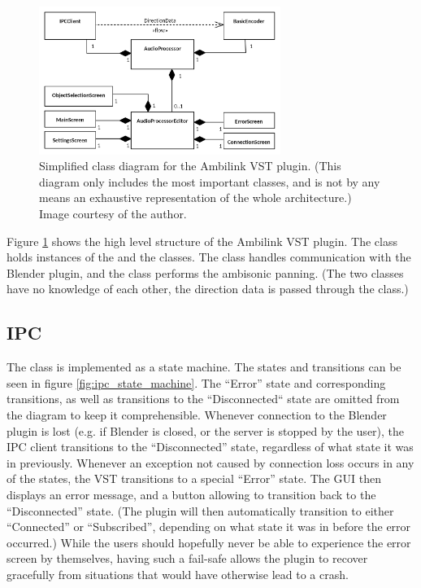 \begin{figure}%
    \centering
    \includegraphics[width=0.7\textwidth]{images/implementation/vst_simplified_class_diagram.png}
    \caption{Simplified class diagram for the Ambilink VST plugin. (This diagram only includes the most important classes, and is not by any means an exhaustive representation of the whole architecture.)
    Image courtesy of the author. \label{fig:vst_class_diagram}}
\end{figure}

Figure \ref{fig:vst_class_diagram} shows the high level structure of the Ambilink VST plugin.
The  class holds instances of the  and the  classes.
The  class handles communication with the Blender plugin, and the  class performs the 
ambisonic panning. (The two classes have no knowledge of each other, the direction data is passed through the  class.)

\subsection{IPC}
The  class is implemented as a state machine. The states and transitions can be seen in figure \ref{fig:ipc_state_machine}.
The ``Error'' state and corresponding transitions, as well as transitions to the ``Disconnected`` state are omitted from the diagram to keep it comprehensible.
Whenever connection to the Blender plugin is lost (e.g. if Blender is closed, or the server is stopped by the user), 
the IPC client transitions to the ``Disconnected'' state, regardless of what state it was in previously.
Whenever an exception not caused by connection loss occurs in any of the states, the VST transitions to a special ``Error'' state. 
The GUI then displays an error message, and a button allowing to transition back to the ``Disconnected'' state.
(The plugin will then automatically transition to either ``Connected'' or ``Subscribed'', depending on what state it was in before the error occurred.)
While the users should hopefully never be able to experience the error screen by themselves,
having such a fail-safe allows the plugin to recover gracefully from situations that would have otherwise lead to a crash.

